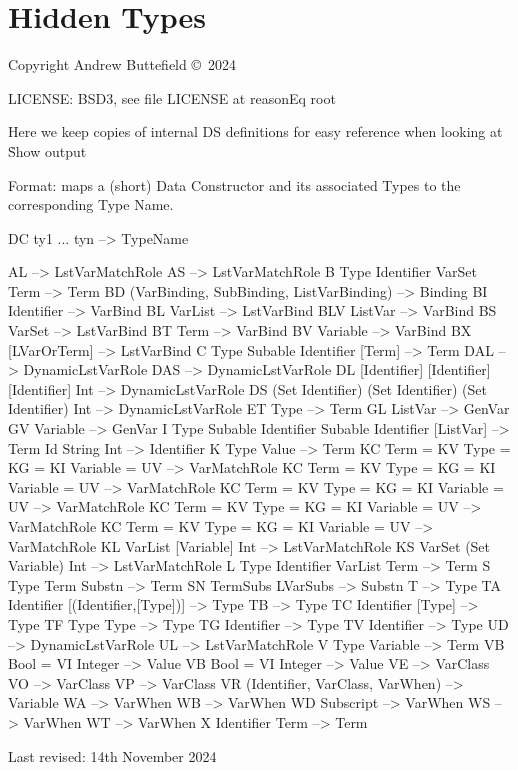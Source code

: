 \chapter{Hidden Types}

Copyright  Andrew Buttefield \copyright\ 2024

LICENSE: BSD3, see file LICENSE at reasonEq root


Here we keep copies of internal DS definitions
for easy reference when looking at \h{Show} output
\newpage

Format: maps a (short) Data Constructor and its associated Types to the corresponding Type Name.
\begin{code}
DC ty1 ... tyn -->  TypeName
\end{code}


\begin{code}
AL  -->  LstVarMatchRole
AS  -->  LstVarMatchRole
B Type Identifier VarSet Term  -->  Term
BD (VarBinding, SubBinding, ListVarBinding)  -->  Binding
BI Identifier  -->  VarBind
BL  VarList  -->  LstVarBind
BLV ListVar   -->  VarBind
BS  VarSet  -->  LstVarBind
BT Term  -->  VarBind
BV Variable   -->  VarBind
BX  [LVarOrTerm]   -->  LstVarBind
C Type Subable Identifier [Term]  -->  Term
DAL  -->  DynamicLstVarRole
DAS  -->  DynamicLstVarRole
DL [Identifier] [Identifier] [Identifier] Int  -->  DynamicLstVarRole
DS (Set Identifier) (Set Identifier) (Set Identifier) Int --> DynamicLstVarRole
ET Type   -->  Term
GL ListVar   -->  GenVar
GV Variable -->  GenVar
I Type Subable Identifier Subable Identifier [ListVar]  -->  Term
Id String Int  --> Identifier
K Type Value  -->  Term
KC Term = KV Type = KG = KI Variable = UV   -->  VarMatchRole
KC Term = KV Type = KG = KI Variable = UV   -->  VarMatchRole
KC Term = KV Type = KG = KI Variable = UV   -->  VarMatchRole
KC Term = KV Type = KG = KI Variable = UV   -->  VarMatchRole
KC Term = KV Type = KG = KI Variable = UV   -->  VarMatchRole
KL VarList [Variable] Int  -->  LstVarMatchRole
KS VarSet (Set Variable) Int  -->  LstVarMatchRole
L Type Identifier VarList Term  -->  Term
S Type Term Substn -->  Term
SN TermSubs LVarSubs   -->  Substn
T  -->  Type
TA Identifier [(Identifier,[Type])]  -->  Type
TB   -->  Type
TC Identifier [Type]  -->  Type
TF Type Type  -->  Type
TG Identifier -->  Type
TV Identifier  -->  Type
UD   -->  DynamicLstVarRole
UL   -->  LstVarMatchRole
V Type Variable  -->  Term
VB Bool = VI Integer   -->  Value
VB Bool = VI Integer   -->  Value
VE  -->  VarClass
VO  -->  VarClass
VP   -->  VarClass
VR (Identifier, VarClass, VarWhen)  -->  Variable
WA  -->  VarWhen
WB  -->  VarWhen
WD Subscript  -->  VarWhen
WS  -->  VarWhen
WT   -->  VarWhen
X Identifier Term  -->  Term
\end{code}
Last revised: 14th November 2024